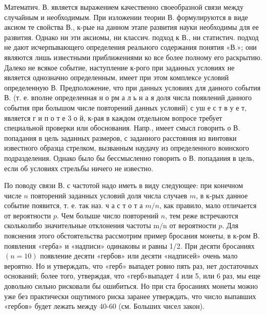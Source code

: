 \documentclass[10pt]{article}
\begin{document}
Математич. В. является выражением качественно своеобразной связи между случайным и необходимым. При изложении теории В. формулируются в виде аксиом те свойства В., к-рые на данном этапе развития науки необходимы для ее развития. Однако ни эти аксиомы, ни классич. подход к В., ни статистич. подход не дают исчерпывающего определения реального содержания понятия «В.»; они являются лишь известными приближениями ко все более полному его раскрытию. Далеко не всякое событие, наступление к-рого при заданных условиях не является однозначно определенным, имеет при этом комплексе условий определенную В. Предположение, что при данных условиях для данного события В. (т. е. вполне определенная н о рм а л ь н а я доля числа появлений данного события при болышом числе повторений данных условий) с уш е с т в у е т, является г и п о т е 3 о й, к-рая в каждом отдельном вопросе требует специальной проверки или обоснования. Напр., имеет смысл говорить о В. попадания в цель заданных размеров, с заданного расстояния из винтовки известного образца стрелком, вызванным наудачу из определенного воинского подразделения. Однако было бы бессмысленно говорить о В. попадания в цель, если об условиях стрельбы ничего не известно.



По поводу связи В. с частотой надо иметь в виду следующее: при конечном числе $n$ повторений заданных условий доля числа случаев $m$, в к-рых данное событие появится, т. е. так наз. ч а с т о т а $m / n$, как правило, мало отличается от вероятности $p$. Чем болыше число повторений $n$, тем реже встречаются скольколибо значительные отклонения частоты $\mathrm{m} / \mathrm{n}$ от вероятности $p$. Для пояснения этого обстоятельства рассмотрим пример бросания монеты, в к-ром В. появления «герба» и «надписи» одинаковы и равны 1/2. При десяти бросаниях $(n=10)$ появление десяти «гербов» или десяти «надписей» очень мало вероятно. Но и утверждать, что «герб» выпадет ровно пять раз, нет достаточных оснований; более того, утверждая, что «герб»выпадет 4 или 5, или 6 раз, мы еще довольно сильно рисковали бы ошибиться. Но при ста бросаниях монеты можно уже без практически ощутимого риска заранее утверждать, что число выпавших «гербов» будет лежать между 40-60 (см. Больших чисел закон).
\end{document}
